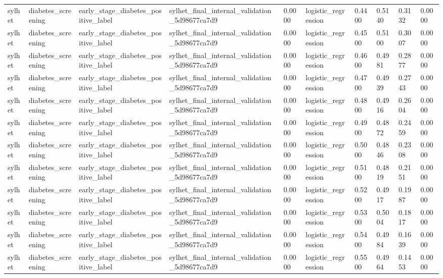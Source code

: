 \begin{tabular}{llllllllll}
sylhet & diabetes\_screening & early\_stage\_diabetes\_positive\_label & sylhet\_final\_internal\_validation\_5d98677ca7d9 & 0.0000 & logistic\_regression & 0.4400 & 0.5140 & 0.3132 & 0.0000 \\
sylhet & diabetes\_screening & early\_stage\_diabetes\_positive\_label & sylhet\_final\_internal\_validation\_5d98677ca7d9 & 0.0000 & logistic\_regression & 0.4500 & 0.5100 & 0.3007 & 0.0000 \\
sylhet & diabetes\_screening & early\_stage\_diabetes\_positive\_label & sylhet\_final\_internal\_validation\_5d98677ca7d9 & 0.0000 & logistic\_regression & 0.4600 & 0.4981 & 0.2877 & 0.0000 \\
sylhet & diabetes\_screening & early\_stage\_diabetes\_positive\_label & sylhet\_final\_internal\_validation\_5d98677ca7d9 & 0.0000 & logistic\_regression & 0.4700 & 0.4939 & 0.2743 & 0.0000 \\
sylhet & diabetes\_screening & early\_stage\_diabetes\_positive\_label & sylhet\_final\_internal\_validation\_5d98677ca7d9 & 0.0000 & logistic\_regression & 0.4800 & 0.4916 & 0.2604 & 0.0000 \\
sylhet & diabetes\_screening & early\_stage\_diabetes\_positive\_label & sylhet\_final\_internal\_validation\_5d98677ca7d9 & 0.0000 & logistic\_regression & 0.4900 & 0.4872 & 0.2459 & 0.0000 \\
sylhet & diabetes\_screening & early\_stage\_diabetes\_positive\_label & sylhet\_final\_internal\_validation\_5d98677ca7d9 & 0.0000 & logistic\_regression & 0.5000 & 0.4846 & 0.2308 & 0.0000 \\
sylhet & diabetes\_screening & early\_stage\_diabetes\_positive\_label & sylhet\_final\_internal\_validation\_5d98677ca7d9 & 0.0000 & logistic\_regression & 0.5100 & 0.4819 & 0.2151 & 0.0000 \\
sylhet & diabetes\_screening & early\_stage\_diabetes\_positive\_label & sylhet\_final\_internal\_validation\_5d98677ca7d9 & 0.0000 & logistic\_regression & 0.5200 & 0.4917 & 0.1987 & 0.0000 \\
sylhet & diabetes\_screening & early\_stage\_diabetes\_positive\_label & sylhet\_final\_internal\_validation\_5d98677ca7d9 & 0.0000 & logistic\_regression & 0.5300 & 0.5004 & 0.1817 & 0.0000 \\
sylhet & diabetes\_screening & early\_stage\_diabetes\_positive\_label & sylhet\_final\_internal\_validation\_5d98677ca7d9 & 0.0000 & logistic\_regression & 0.5400 & 0.4984 & 0.1639 & 0.0000 \\
sylhet & diabetes\_screening & early\_stage\_diabetes\_positive\_label & sylhet\_final\_internal\_validation\_5d98677ca7d9 & 0.0000 & logistic\_regression & 0.5500 & 0.4964 & 0.1453 & 0.0000 \\

\end{tabular}
